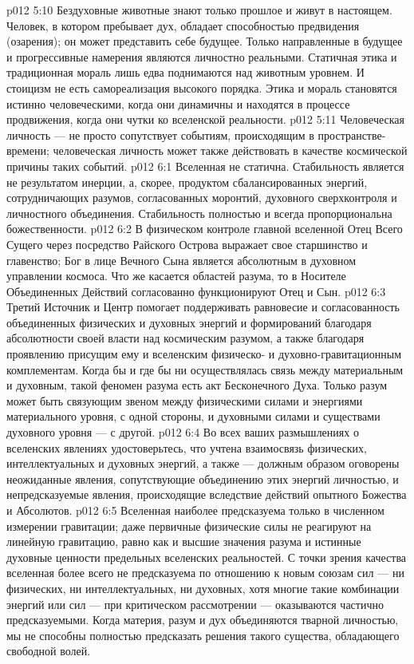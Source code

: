 \vs p012 5:10 \pc Бездуховные животные знают только прошлое и живут в настоящем. Человек, в котором пребывает дух, обладает способностью предвидения (озарения); он может представить себе будущее. Только направленные в будущее и прогрессивные намерения являются личностно реальными. Статичная этика и традиционная мораль лишь едва поднимаются над животным уровнем. И стоицизм не есть самореализация высокого порядка. Этика и мораль становятся истинно человеческими, когда они динамичны и находятся в процессе продвижения, когда они чутки ко вселенской реальности.
\vs p012 5:11 Человеческая личность --- не просто сопутствует событиям, происходящим в пространстве\hyp{}времени; человеческая личность может также действовать в качестве космической причины таких событий.
\vs p012 6:1 Вселенная не статична. Стабильность является не результатом инерции, а, скорее, продуктом сбалансированных энергий, сотрудничающих разумов, согласованных моронтий, духовного сверхконтроля и личностного объединения. Стабильность полностью и всегда пропорциональна божественности.
\vs p012 6:2 В физическом контроле главной вселенной Отец Всего Сущего через посредство Райского Острова выражает свое старшинство и главенство; Бог в лице Вечного Сына является абсолютным в духовном управлении космоса. Что же касается областей разума, то в Носителе Объединенных Действий согласованно функционируют Отец и Сын.
\vs p012 6:3 Третий Источник и Центр помогает поддерживать равновесие и согласованность объединенных физических и духовных энергий и формирований благодаря абсолютности своей власти над космическим разумом, а также благодаря проявлению присущим ему и вселенским физическо\hyp{} и духовно\hyp{}гравитационным комплементам. Когда бы и где бы ни осуществлялась связь между материальным и духовным, такой феномен разума есть акт Бесконечного Духа. Только разум может быть связующим звеном между физическими силами и энергиями материального уровня, с одной стороны, и духовными силами и существами духовного уровня --- с другой.
\vs p012 6:4 Во всех ваших размышлениях о вселенских явлениях удостоверьтесь, что учтена взаимосвязь физических, интеллектуальных и духовных энергий, а также --- должным образом оговорены неожиданные явления, сопутствующие объединению этих энергий личностью, и непредсказуемые явления, происходящие вследствие действий опытного Божества и Абсолютов.
\vs p012 6:5 Вселенная наиболее предсказуема только в численном измерении гравитации; даже первичные физические силы не реагируют на линейную гравитацию, равно как и высшие значения разума и истинные духовные ценности предельных вселенских реальностей. С точки зрения качества вселенная более всего не предсказуема по отношению к новым союзам сил --- ни физических, ни интеллектуальных, ни духовных, хотя многие такие комбинации энергий или сил --- при критическом рассмотрении --- оказываются частично предсказуемыми. Когда материя, разум и дух объединяются тварной личностью, мы не способны полностью предсказать решения такого существа, обладающего свободной волей.
